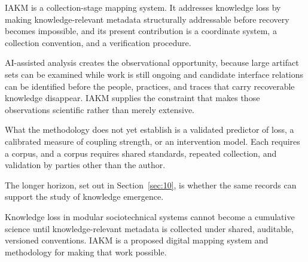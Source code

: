 \documentclass[preprints,article,submit,moreauthors]{Definitions/mdpi}
\begin{document}
IAKM is a collection-stage mapping system. It addresses knowledge loss by making knowledge-relevant metadata structurally addressable before recovery becomes impossible, and its present contribution is a coordinate system, a collection convention, and a verification procedure.

AI-assisted analysis creates the observational opportunity, because large artifact sets can be examined while work is still ongoing and candidate interface relations can be identified before the people, practices, and traces that carry recoverable knowledge disappear. IAKM supplies the constraint that makes those observations scientific rather than merely extensive.

What the methodology does not yet establish is a validated predictor of loss, a calibrated measure of coupling strength, or an intervention model. Each requires a corpus, and a corpus requires shared standards, repeated collection, and validation by parties other than the author.

The longer horizon, set out in Section~\ref{sec:10}, is whether the same records can support the study of knowledge emergence.

Knowledge loss in modular sociotechnical systems cannot become a cumulative science until knowledge-relevant metadata is collected under shared, auditable, versioned conventions. IAKM is a proposed digital mapping system and methodology for making that work possible.




\end{document}
